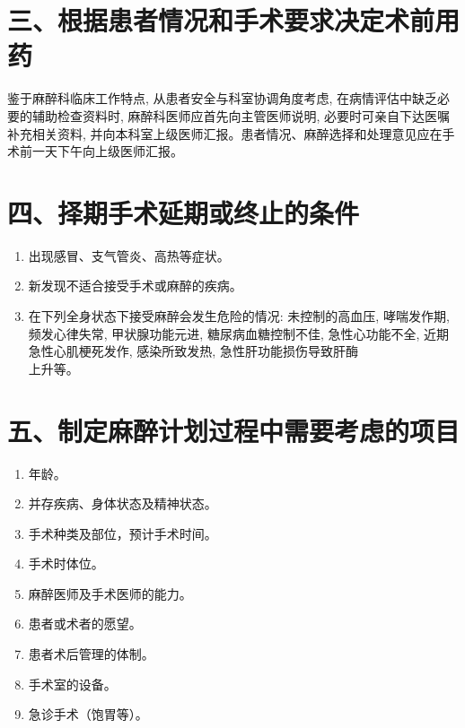 \documentclass[10pt]{article}
\begin{document}
\section*{三、根据患者情况和手术要求决定术前用药}
鉴于麻醉科临床工作特点, 从患者安全与科室协调角度考虑, 在病情评估中缺乏必要的辅助检查资料时, 麻醉科医师应首先向主管医师说明, 必要时可亲自下达医嘱补充相关资料, 并向本科室上级医师汇报。患者情况、麻醉选择和处理意见应在手术前一天下午向上级医师汇报。

\section*{四、择期手术延期或终止的条件}
\begin{enumerate}
  \item 出现感冒、支气管炎、高热等症状。

  \item 新发现不适合接受手术或麻醉的疾病。

  \item 在下列全身状态下接受麻醉会发生危险的情况: 未控制的高血压, 哮喘发作期, 频发心律失常, 甲状腺功能元进, 糖尿病血糖控制不佳, 急性心功能不全, 近期急性心肌梗死发作, 感染所致发热, 急性肝功能损伤导致肝酶\\
上升等。

\end{enumerate}

\section*{五、制定麻醉计划过程中需要考虑的项目}
\begin{enumerate}
  \item 年龄。

  \item 并存疾病、身体状态及精神状态。

  \item 手术种类及部位，预计手术时间。

  \item 手术时体位。

  \item 麻醉医师及手术医师的能力。

  \item 患者或术者的愿望。

  \item 患者术后管理的体制。

  \item 手术室的设备。

  \item 急诊手术（饱胃等）。

\end{enumerate}
\end{document}
